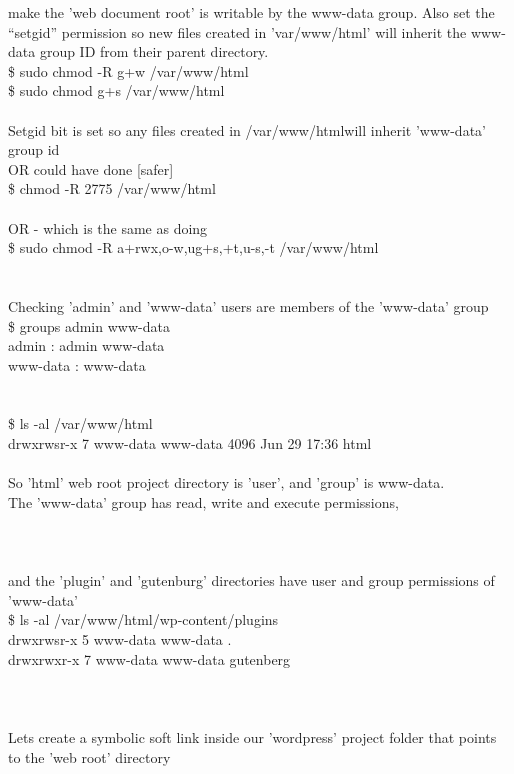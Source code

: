 \documentclass[10pt,a4paper]{article}
\begin{document}
{{{{{{{{{{{{{{{{{{{{make the 'web document root' is writable by the www-data group. Also set the ``setgid'' permission so new files created in 'var/www/html' will inherit the www-data group ID from their parent directory.\\
\$ sudo chmod -R g+w /var/www/html}{\large \\
\$ sudo chmod g+s /var/www/html}{\large \\
\\
Setgid bit is set so any files created in /var/www/html}{\large  will inherit 'www-data' group id\\
OR could have done [safer]\\
\$ chmod -R 2775 /var/www/html}{\large \\
\\
OR - which is the same as doing\\
\$ sudo chmod -R a+rwx,o-w,ug+s,+t,u-s,-t  /var/www/html}{\large \\
\\
\\
Checking  'admin' and 'www-data' users are members of the 'www-data' group\\
\$ groups admin www-data\\
admin : admin www-data\\
www-data : www-data\\
\\
[(d)   user   group   other]\\
\$ ls -al /var/www/html}{\large \\
drwxrwsr-x  7   www-data    www-data    4096 Jun 29 17:36 html\\
\\
So 'html' web root project directory is 'user', and 'group' is www-data. \\
The 'www-data' group has read, write and execute permissions, \\
\\
\\
\\
and the 'plugin' and 'gutenburg' directories have user and group permissions of 'www-data'\\
\$ ls -al /var/www/html/wp-content/plugins}{\large \\
drwxrwsr-x 5    www-data    www-data  .\\
drwxrwxr-x 7    www-data    www-data   gutenberg\\
\\
\\
\\
Lets create a symbolic soft link inside our 'wordpress' project folder that points to the 'web root' directory\\
}}}}}}}}}}}}}}}}}}}}
\end{document}
